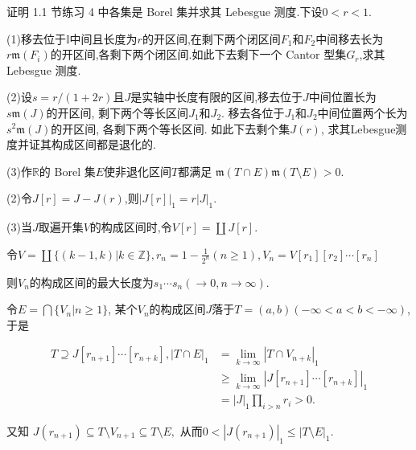 \begin{2}
证明 1.1 节练习 4 中各集是 Borel 集并求其 Lebesgue 测度.下设$0<r<1$.

(1)移去位于$\mathbb{I}$中间且长度为$r$的开区间,在剩下两个闭区间$F_1$和$F_2$中间移去长为$r\mathfrak{m}(F_i)$的开区间,各剩下两个闭区间.如此下去剩下一个 Cantor 型集$G_{r}$,求其 Lebesgue 测度.

(2)设$s=r/(1+2r)$且$J$是实轴中长度有限的区间,移去位于$J$中间位置长为$s\mathfrak{m}(J)$的开区间, 剩下两个等长区间$J_1$和$J_2$. 
移去各位于$J_1$和$J_2$中间位置两个长为$s^2\mathfrak{m}(J)$的开区间, 各剩下两个等长区间. 
如此下去剩个集$J(r)$, 求其Lebesgue测度并证其构成区间都是退化的.

(3)作$\mathbb{R}$的 Borel 集$E$使非退化区间$T$都满足 $\mathfrak{m}(T\cap E)\mathfrak{m}(T\setminus E)>0.$
\end{2}
\begin{solution}

(2)令$J[r]=J-J(r)$,则$|J[r]|_{1}=r|J|_{1}.$

(3)当$J$取遍开集$V$的构成区间时,令$V[r]=\coprod J[r].$

令$V=\coprod\{(k-1,k)|k\in\mathbb{Z}\},r_{n}=1-\frac{1}{2^{n}}(n\geqslant1),V_{n}=V[r_{1}][r_{2}]\cdots[r_{n}]$

则$V_{n}$的构成区间的最大长度为$s_{1}\cdots s_{n}(\to0, n\to\infty)$.

令$E=\bigcap\{V_{n}|n\geqslant1\}$, 
某个$V_n$的构成区间$J$落于$T=\left(a,b\right)\left(-\infty<a<b<-\infty\right)$, 于是

\begin{align*}
    T\supseteq J[r_{n+1}]\cdots[r_{n+k}],|T\cap E|_{1}&=\lim_{k\to\infty}|T\cap V_{n+k}|_{1}\\
&\geqslant\lim_{k\to\infty}|J[r_{n+1}]\cdots[r_{n+k}]|_{1}\\
&=|J|_{1}\prod_{i>n} r_i>0.
\end{align*}


又知 $J(r_{n+1})\subseteq T\setminus V_{n+1}\subseteq T\setminus E,$
从而$0<|J(r_{n+1})|_1\leqslant|T\setminus E|_1.$
\end{solution}


